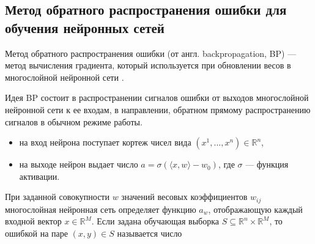 




\subsection{Метод обратного распространения ошибки для обучения нейронных сетей}
Метод обратного распространения ошибки (от англ. backpropagation, BP) --- метод вычисления градиента, который используется при обновлении весов в многослойной нейронной сети \cite[]{eight}.

Идея BP состоит в распространении сигналов ошибки от выходов
многослойной нейронной сети к ее входам, в направлении, обратном прямому распространению сигналов в обычном режиме работы.

\begin{itemize}
    \item на вход нейрона поступает кортеж чисел вида $(x^1,...,x^n) \in \mathbb{R}^n$,
    \item на выходе нейрон выдает число $a = \sigma(\langle x, w \rangle - w_0)$, где $\sigma$ --- функция активации.
\end{itemize}

При заданной совокупности $w$ значений весовых коэффициентов $w_{ij}$ многослойная нейронная сеть определяет функцию $a_w$, 
отображающую каждый входной вектор $x \in \mathbb{R}^M$. Если задана обучающая выборка $S \subseteq \mathbb{R}^n \times \mathbb{R}^M$, 
то ошибкой на паре $(x, y) \in S$ называется число

